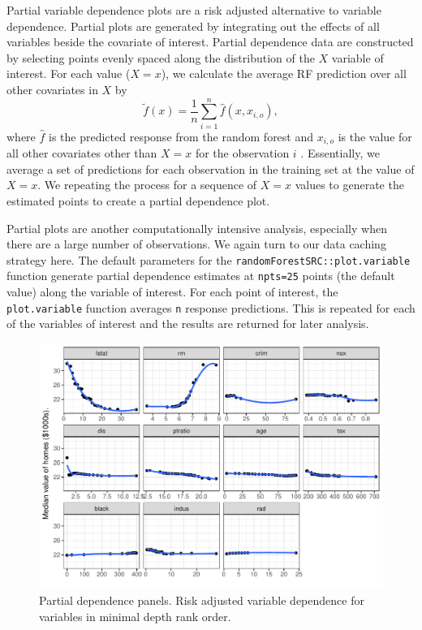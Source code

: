 \documentclass[article]{jss}
\begin{document}
Partial variable dependence plots are a risk adjusted alternative to
variable dependence. Partial plots are generated by integrating out the
effects of all variables beside the covariate of interest. Partial
dependence data are constructed by selecting points evenly spaced along
the distribution of the \(X\) variable of interest. For each value
(\(X = x\)), we calculate the average RF prediction over all other
covariates in \(X\) by
\[ \tilde{f}(x) = \frac{1}{n} \sum_{i = 1}^n \hat{f}(x, x_{i, o}), \]
where \(\hat{f}\) is the predicted response from the random forest and
\(x_{i, o}\) is the value for all other covariates other than \(X = x\)
for the observation \(i\) \citep{Friedman:2000}. Essentially, we average
a set of predictions for each observation in the training set at the
value of \(X=x\). We repeating the process for a sequence of \(X=x\)
values to generate the estimated points to create a partial dependence
plot.

Partial plots are another computationally intensive analysis, especially
when there are a large number of observations. We again turn to our data
caching strategy here. The default parameters for the
\texttt{randomForestSRC::plot.variable} function generate partial
dependence estimates at \texttt{npts=25} points (the default value)
along the variable of interest. For each point of interest, the
\texttt{plot.variable} function averages \texttt{n} response
predictions. This is repeated for each of the variables of interest and
the results are returned for later analysis.

\begin{CodeChunk}
\begin{figure}

{\centering \includegraphics{Regression-rfsrc_files/figure-latex/partial-1} 

}

\caption[Partial dependence panels]{Partial dependence panels. Risk adjusted variable dependence for variables in minimal depth rank order.}\label{fig:partial}
\end{figure}
\end{CodeChunk}
\end{document}
